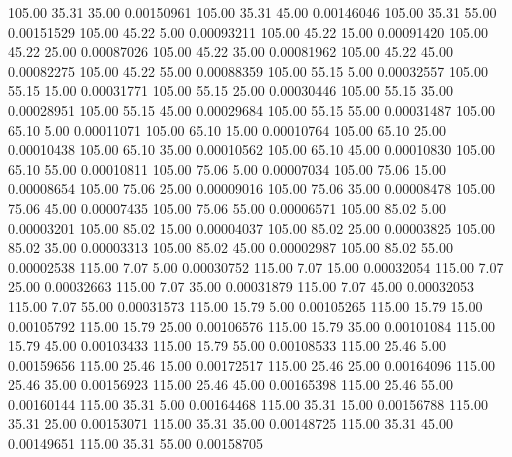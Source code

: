    105.00     35.31     35.00     0.00150961
    105.00     35.31     45.00     0.00146046
    105.00     35.31     55.00     0.00151529
    105.00     45.22      5.00     0.00093211
    105.00     45.22     15.00     0.00091420
    105.00     45.22     25.00     0.00087026
    105.00     45.22     35.00     0.00081962
    105.00     45.22     45.00     0.00082275
    105.00     45.22     55.00     0.00088359
    105.00     55.15      5.00     0.00032557
    105.00     55.15     15.00     0.00031771
    105.00     55.15     25.00     0.00030446
    105.00     55.15     35.00     0.00028951
    105.00     55.15     45.00     0.00029684
    105.00     55.15     55.00     0.00031487
    105.00     65.10      5.00     0.00011071
    105.00     65.10     15.00     0.00010764
    105.00     65.10     25.00     0.00010438
    105.00     65.10     35.00     0.00010562
    105.00     65.10     45.00     0.00010830
    105.00     65.10     55.00     0.00010811
    105.00     75.06      5.00     0.00007034
    105.00     75.06     15.00     0.00008654
    105.00     75.06     25.00     0.00009016
    105.00     75.06     35.00     0.00008478
    105.00     75.06     45.00     0.00007435
    105.00     75.06     55.00     0.00006571
    105.00     85.02      5.00     0.00003201
    105.00     85.02     15.00     0.00004037
    105.00     85.02     25.00     0.00003825
    105.00     85.02     35.00     0.00003313
    105.00     85.02     45.00     0.00002987
    105.00     85.02     55.00     0.00002538
    115.00      7.07      5.00     0.00030752
    115.00      7.07     15.00     0.00032054
    115.00      7.07     25.00     0.00032663
    115.00      7.07     35.00     0.00031879
    115.00      7.07     45.00     0.00032053
    115.00      7.07     55.00     0.00031573
    115.00     15.79      5.00     0.00105265
    115.00     15.79     15.00     0.00105792
    115.00     15.79     25.00     0.00106576
    115.00     15.79     35.00     0.00101084
    115.00     15.79     45.00     0.00103433
    115.00     15.79     55.00     0.00108533
    115.00     25.46      5.00     0.00159656
    115.00     25.46     15.00     0.00172517
    115.00     25.46     25.00     0.00164096
    115.00     25.46     35.00     0.00156923
    115.00     25.46     45.00     0.00165398
    115.00     25.46     55.00     0.00160144
    115.00     35.31      5.00     0.00164468
    115.00     35.31     15.00     0.00156788
    115.00     35.31     25.00     0.00153071
    115.00     35.31     35.00     0.00148725
    115.00     35.31     45.00     0.00149651
    115.00     35.31     55.00     0.00158705
